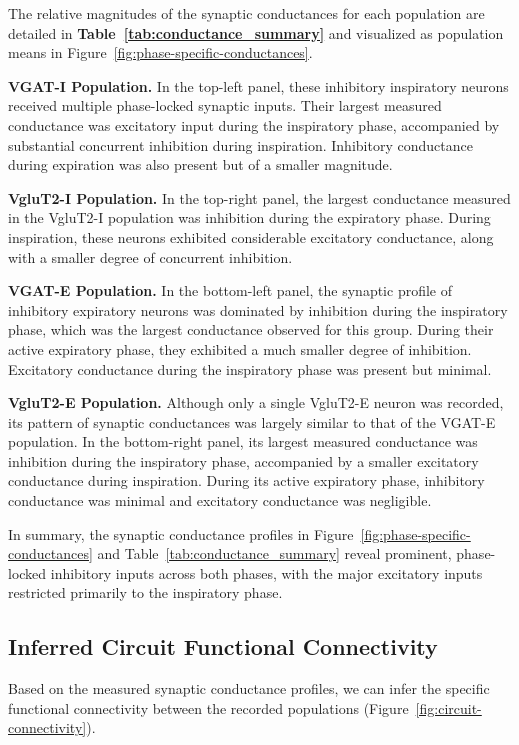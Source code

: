 \documentclass[
]{article}
\newcommand{\figref}[1]{Figure~\ref{#1}}
\begin{document}
The relative magnitudes of the synaptic conductances for each population are detailed in \textbf{Table~\ref{tab:conductance_summary}} and visualized as population means in \figref{fig:phase-specific-conductances}.

\textbf{VGAT-I Population.} In the top-left panel, these inhibitory inspiratory neurons received multiple phase-locked synaptic inputs. Their largest measured conductance was excitatory input during the inspiratory phase, accompanied by substantial concurrent inhibition during inspiration. Inhibitory conductance during expiration was also present but of a smaller magnitude.

\textbf{VgluT2-I Population.} In the top-right panel, the largest conductance measured in the VgluT2-I population was inhibition during the expiratory phase. During inspiration, these neurons exhibited considerable excitatory conductance, along with a smaller degree of concurrent inhibition.

\textbf{VGAT-E Population.} In the bottom-left panel, the synaptic profile of inhibitory expiratory neurons was dominated by inhibition during the inspiratory phase, which was the largest conductance observed for this group. During their active expiratory phase, they exhibited a much smaller degree of inhibition. Excitatory conductance during the inspiratory phase was present but minimal.

\textbf{VgluT2-E Population.} Although only a single VgluT2-E neuron was recorded, its pattern of synaptic conductances was largely similar to that of the VGAT-E population. In the bottom-right panel, its largest measured conductance was inhibition during the inspiratory phase, accompanied by a smaller excitatory conductance during inspiration. During its active expiratory phase, inhibitory conductance was minimal and excitatory conductance was negligible.

In summary, the synaptic conductance profiles in \figref{fig:phase-specific-conductances} and Table~\ref{tab:conductance_summary} reveal prominent, phase-locked inhibitory inputs across both phases, with the major excitatory inputs restricted primarily to the inspiratory phase.

\subsection{Inferred Circuit Functional Connectivity}\label{inferred-circuit-functional-connectivity}

Based on the measured synaptic conductance profiles, we can infer the specific functional connectivity between the recorded populations (\figref{fig:circuit-connectivity}).
\end{document}
